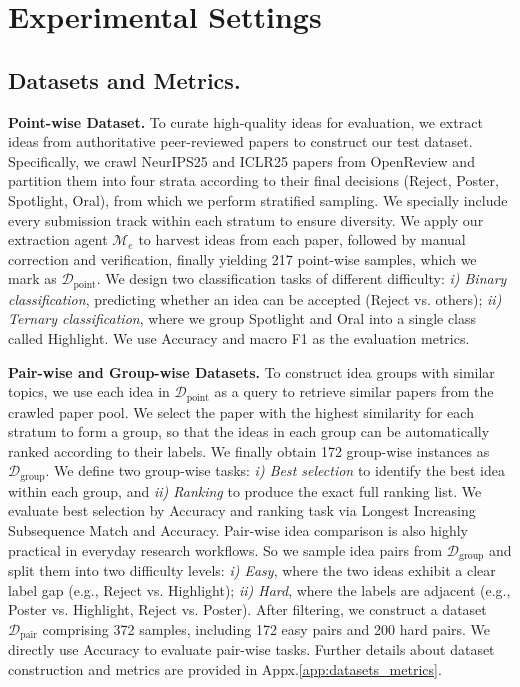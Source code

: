



\section{Experimental Settings}
\subsection{Datasets and Metrics.}
\label{sec:datasets_metrics}
\textbf{Point-wise Dataset.}
To curate high-quality ideas for evaluation, we extract ideas from authoritative peer-reviewed papers to construct our test dataset.
Specifically, we crawl NeurIPS25 and ICLR25 papers from OpenReview and partition them into four strata according to their final decisions (Reject, Poster, Spotlight, Oral), from which we perform stratified sampling.
We specially include every submission track within each stratum to ensure diversity.
We apply our extraction agent $\boldsymbol{\mathcal{M}}_e$ to harvest ideas from each paper, followed by manual correction and verification, finally yielding 217 point-wise samples, which we mark as $\boldsymbol{\mathcal{D}}_\textrm{point}$.
We design two classification tasks of different difficulty:
\textit{i) Binary classification}, predicting whether an idea can be accepted (Reject vs. others);
\textit{ii) Ternary classification}, where we group Spotlight and Oral into a single class called Highlight.
We use Accuracy and macro F1 as the evaluation metrics.

\textbf{Pair-wise and Group-wise Datasets.}
To construct idea groups with similar topics, we use each idea in $\boldsymbol{\mathcal{D}}_\textrm{point}$ as a query to retrieve similar papers from the crawled paper pool.
We select the paper with the highest similarity for each stratum to form a group, so that the ideas in each group can be automatically ranked according to their labels.
We finally obtain 172 group-wise instances as $\boldsymbol{\mathcal{D}}_\textrm{group}$.
We define two group-wise tasks:
\textit{i) Best selection} to identify the best idea within each group, and  
\textit{ii) Ranking} to produce the exact full ranking list.  
We evaluate best selection by Accuracy and ranking task via Longest Increasing Subsequence Match and Accuracy.
Pair-wise idea comparison is also highly practical in everyday research workflows.
So we sample idea pairs from $\boldsymbol{\mathcal{D}}_\textrm{group}$ and split them into two difficulty levels:
\textit{i) Easy}, where the two ideas exhibit a clear label gap (e.g., Reject vs. Highlight);  
\textit{ii) Hard}, where the labels are adjacent (e.g., Poster vs. Highlight, Reject vs. Poster).
After filtering, we construct a dataset $\boldsymbol{\mathcal{D}}_{\textrm{pair}}$ comprising 372 samples, including 172 easy pairs and 200 hard pairs.
We directly use Accuracy to evaluate pair-wise tasks.
Further details about dataset construction and metrics are provided in Appx.\ref{app:datasets_metrics}.

